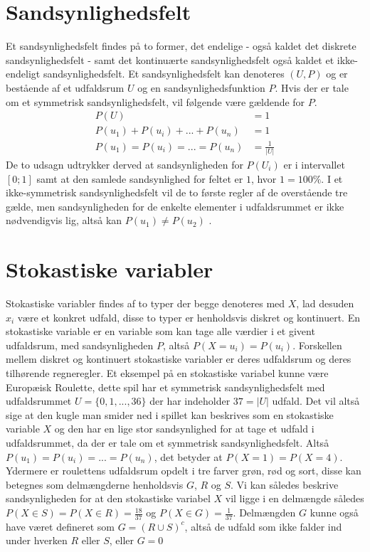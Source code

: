 \documentclass[../../SRP.tex]{subfiles}
\begin{document}
\section{Sandsynlighedsfelt}

Et sandsynlighedsfelt findes på to former, det endelige - også kaldet det diskrete sandsynlighedsfelt - samt det kontinuærte sandsynlighedsfelt også kaldet et ikke-endeligt sandsynlighedsfelt. Et sandsynlighedsfelt kan denoteres $(U, P)$ og er bestående af et udfaldsrum $U$ og en sandsynlighedsfunktion $P$. Hvis der er tale om et symmetrisk sandsynlighedsfelt, vil følgende være gældende for $P$.
\begin{align}
  P(U) &= 1 \\
  P(u_1) + P(u_i) + ... + P(u_n) &= 1 \\
  P(u_1) = P(u_i) = ... = P(u_n) &= \frac{1}{|U|}
\end{align}
De to udsagn udtrykker derved at sandsynligheden for $P(U_i)$ er i intervallet $[0;1]$ samt at den samlede sandsynlighed for feltet er $1$, hvor $1 = 100\%$. I et ikke-symmetrisk sandsynlighedsfelt vil de to første regler af de overstående tre gælde, men sandsynligheden for de enkelte elementer i udfaldsrummet er ikke nødvendigvis lig, altså kan $P(u_1) \neq P(u_2)$ \cite{SC}.\\

\section{Stokastiske variabler}

Stokastiske variabler findes af to typer der begge denoteres med $X$, lad desuden $x_i$ være et konkret udfald, disse to typer er henholdsvis diskret og kontinuert. En stokastiske variable er en variable som kan tage alle værdier i et givent udfaldsrum, med sandsynligheden $P$, altså $P(X = u_i) = P(u_i)$. Forskellen mellem diskret og kontinuert stokastiske variabler er deres udfaldsrum og deres tilhørende regneregler. Et eksempel på en stokastiske variabel kunne være Europæisk Roulette, dette spil har et symmetrisk sandsynlighedsfelt med udfaldsrummet $U = \{ 0,1,...,36\}$ der har indeholder $37 = |U|$ udfald. Det vil altså sige at den kugle man smider ned i spillet kan beskrives som en stokastiske variable $X$ og den har en lige stor sandsynlighed for at tage et udfald i udfaldsrummet, da der er tale om et symmetrisk sandsynlighedsfelt. Altså $P(u_1) = P(u_i) = ... = P(u_n)$, det betyder at $P(X = 1) = P(X = 4)$. Ydermere er roulettens udfaldsrum opdelt i tre farver grøn, rød og sort, disse kan betegnes som delmængderne henholdsvis $G$, $R$ og $S$. Vi kan således beskrive sandsynligheden for at den stokastiske variabel $X$ vil ligge i en delmængde således $P(X \in S) = P(X \in R) = \frac{18}{37}$ og $P(X \in G) = \frac{1}{37}$. Delmængden $G$ kunne også have været defineret som $G = (R \cup S)^c$, altså de udfald som ikke falder ind under hverken $R$ eller $S$, eller $G = 0$ \cite{NM} \\
\end{document}
